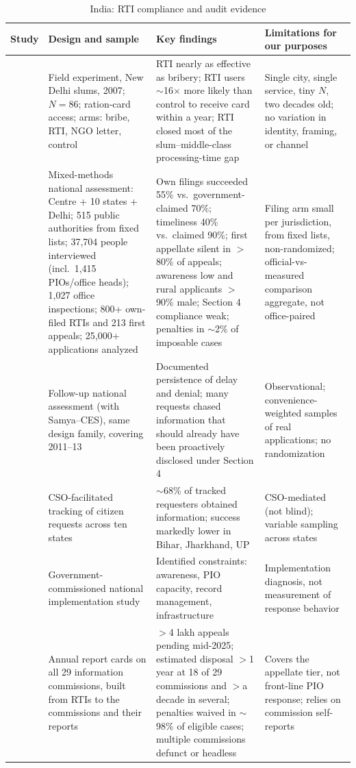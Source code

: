 \documentclass[11pt]{article}
\begin{document}
\begin{table}[htbp]
\centering
\caption{India: RTI compliance and audit evidence}
\label{tab:lit_india}
\scriptsize
\begin{tabularx}{\textwidth}{>{\raggedright\arraybackslash}p{2.6cm}LLL}
\toprule
Study & Design and sample & Key findings & Limitations for our purposes \\
\midrule
\citet{peisakhin2010, peisakhin2012} & Field experiment, New Delhi slums, 2007; $N=86$; ration-card access; arms: bribe, RTI, NGO letter, control & RTI nearly as effective as bribery; RTI users $\sim$16$\times$ more likely than control to receive card within a year; RTI closed most of the slum--middle-class processing-time gap & Single city, single service, tiny $N$, two decades old; no variation in identity, framing, or channel \\
\addlinespace
\citet{raag2009} & Mixed-methods national assessment: Centre + 10 states + Delhi; 515 public authorities from fixed lists; 37,704 people interviewed (incl.\ 1,415 PIOs/office heads); 1,027 office inspections; 800+ own-filed RTIs and 213 first appeals; 25,000+ applications analyzed & Own filings succeeded 55\% vs.\ government-claimed 70\%; timeliness 40\% vs.\ claimed 90\%; first appellate silent in $>$80\% of appeals; awareness low and rural applicants $>$90\% male; Section 4 compliance weak; penalties in $\sim$2\% of imposable cases & Filing arm small per jurisdiction, from fixed lists, non-randomized; official-vs-measured comparison aggregate, not office-paired \\
\addlinespace
\citet{raag2014} & Follow-up national assessment (with Samya--CES), same design family, covering 2011--13 & Documented persistence of delay and denial; many requests chased information that should already have been proactively disclosed under Section 4 & Observational; convenience-weighted samples of real applications; no randomization \\
\addlinespace
\citet{pria2008} & CSO-facilitated tracking of citizen requests across ten states & $\sim$68\% of tracked requesters obtained information; success markedly lower in Bihar, Jharkhand, UP & CSO-mediated (not blind); variable sampling across states \\
\addlinespace
\citet{pwc2009} & Government-commissioned national implementation study & Identified constraints: awareness, PIO capacity, record management, infrastructure & Implementation diagnosis, not measurement of response behavior \\
\addlinespace
\citet{sns2025} & Annual report cards on all 29 information commissions, built from RTIs to the commissions and their reports & $>$4 lakh appeals pending mid-2025; estimated disposal $>$1 year at 18 of 29 commissions and $>$a decade in several; penalties waived in $\sim$98\% of eligible cases; multiple commissions defunct or headless & Covers the appellate tier, not front-line PIO response; relies on commission self-reports \\

\end{tabularx}
\end{table}
\end{document}
